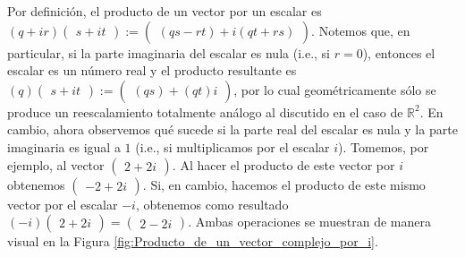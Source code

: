 \documentclass[notasLineal]{subfiles}
\begin{document}
Por definición, el producto de un vector por un escalar es $(q+ir)\begin{pmatrix}s+it\end{pmatrix}:=\begin{pmatrix}(qs-rt)+i(qt+rs)\end{pmatrix}$. Notemos que, en particular, si la parte imaginaria del escalar es nula (i.e., si $r=0$), entonces el escalar es un número real y el producto resultante es $(q)\begin{pmatrix}s+it\end{pmatrix}:=\begin{pmatrix}(qs)+(qt)i\end{pmatrix}$, por lo cual geométricamente sólo se produce un reescalamiento totalmente análogo al discutido en el caso de $\mathbb{R}^2$. En cambio, ahora observemos qué sucede si la parte real del escalar es nula y la parte imaginaria es igual a $1$ (i.e., si multiplicamos por el escalar $i$). Tomemos, por ejemplo, al vector $\begin{pmatrix}2+2i\end{pmatrix}$. Al hacer el producto de este vector por $i$ obtenemos $\begin{pmatrix}-2+2i\end{pmatrix}$. Si, en cambio, hacemos el producto de este mismo vector por el escalar $-i$, obtenemos como resultado $(-i)\begin{pmatrix}2+2i\end{pmatrix}=\begin{pmatrix}2-2i\end{pmatrix}$. Ambas operaciones se muestran de manera visual en la Figura \ref{fig:Producto_de_un_vector_complejo_por_i}. \\
\end{document}
